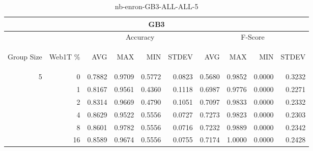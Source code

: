 \begin{center}
\begin{table}[htbp]
\begin{tabular}{ | r | r | r | r | r | r | r | r | r | r |}
\hline
\multicolumn{10}{|c|}{GB3}\\
\hline
 & & \multicolumn{4}{|c|}{Accuracy} & \multicolumn{4}{|c|}{F-Score}\\ \cline{3-10}
\begin{sideways}Group Size\end{sideways} & \begin{sideways}Web1T \%\end{sideways} & \begin{sideways}AVG\end{sideways} & \begin{sideways}MAX\end{sideways} & \begin{sideways}MIN\end{sideways} & \begin{sideways}STDEV\end{sideways} & \begin{sideways}AVG\end{sideways} & \begin{sideways}MAX\end{sideways} & \begin{sideways}MIN\end{sideways} & \begin{sideways}STDEV\end{sideways}\\
\hline
\multirow{5}{*}{5}
 & 0 & 0.7882 & 0.9709 & 0.5772 & 0.0823 & 0.5680 & 0.9852 & 0.0000 & 0.3232\\ \cline{2-10}
 & 1 & 0.8167 & 0.9561 & 0.4360 & 0.1118 & 0.6987 & 0.9776 & 0.0000 & 0.2271\\ \cline{2-10}
 & 2 & 0.8314 & 0.9669 & 0.4790 & 0.1051 & 0.7097 & 0.9833 & 0.0000 & 0.2332\\ \cline{2-10}
 & 4 & 0.8629 & 0.9522 & 0.5556 & 0.0727 & 0.7273 & 0.9823 & 0.0000 & 0.2303\\ \cline{2-10}
 & 8 & 0.8601 & 0.9782 & 0.5556 & 0.0716 & 0.7232 & 0.9889 & 0.0000 & 0.2342\\ \cline{2-10}
 & 16 & 0.8589 & 0.9674 & 0.5556 & 0.0755 & 0.7174 & 1.0000 & 0.0000 & 0.2428\\ \cline{2-10}
\hline
\end{tabular}
\caption{nb-enron-GB3-ALL-ALL-5}
\label{table:nb-enron-GB3-ALL-ALL-5}
\end{table}
\end{center}


